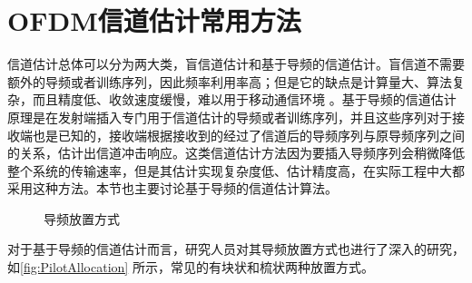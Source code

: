 \section{OFDM信道估计常用方法}
信道估计总体可以分为两大类，盲信道估计和基于导频的信道估计。盲信道不需要额外的导频或者训练序列，因此频率利用率高；但是它的缺点是计算量大、算法复杂，而且精度低、收敛速度缓慢，难以用于移动通信环境
\cite{石钧2012ofdm}。基于导频的信道估计原理是在发射端插入专门用于信道估计的导频或者训练序列，并且这些序列对于接收端也是已知的，接收端根据接收到的经过了信道后的导频序列与原导频序列之间的关系，估计出信道冲击响应。这类信道估计方法因为要插入导频序列会稍微降低整个系统的传输速率，但是其估计实现复杂度低、估计精度高，在实际工程中大都采用这种方法。本节也主要讨论基于导频的信道估计算法。
\begin{figure}[htbp]
    \centering
    \caption{导频放置方式}
    \label{fig:PilotAllocation}
\end{figure}
对于基于导频的信道估计而言，研究人员对其导频放置方式也进行了深入的研究，如\autoref{fig:PilotAllocation} 所示，常见的有块状和梳状两种放置方式。

